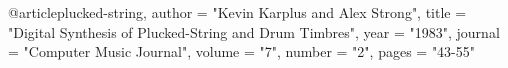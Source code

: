 \documentclass{ucbthesis}
\theoremstyle{plain}
\theoremstyle{definition}
\newtheorem{the trivial conditions}[theorem]{The Trivial Conditions}
\newtheorem{the interesting conditions}[theorem]{The Interesting Conditions}
\newtheorem{basic properties}[theorem]{Basic Properties}
\newtheorem{data memo}[theorem]{Data Memo}
\begin{document}
\begin{frontmatter}



%
%
%
\end{frontmatter}
%





\def\Arccosh{{\rm Arccosh}}



@article{plucked-string,
	author =	"Kevin Karplus and Alex Strong",
	title =		"Digital Synthesis of Plucked-String and Drum Timbres",
	year =		"1983",
	journal =	"Computer Music Journal",
	volume =	"7",
	number =	"2",
	pages =		"43-55"
}
\end{document}
